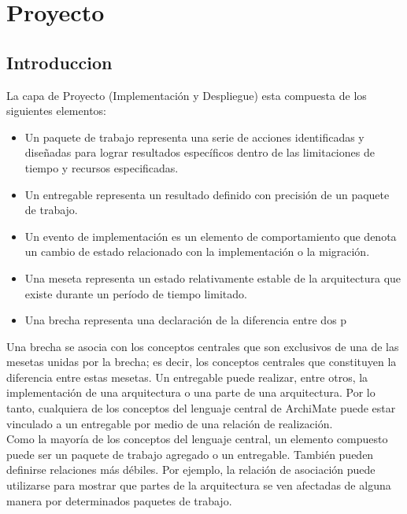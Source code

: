 \chapter{Proyecto}
\section{Introduccion}
La capa de Proyecto (Implementación y Despliegue) esta compuesta de los siguientes elementos:

\begin{itemize}
	\item Un paquete de trabajo representa una serie de acciones identificadas y diseñadas para lograr resultados específicos dentro de las limitaciones de tiempo y recursos especificadas.
	\item Un entregable representa un resultado definido con precisión de un paquete de trabajo.
	\item Un evento de implementación es un elemento de comportamiento que denota un cambio de estado relacionado con la implementación o la migración.
	\item Una meseta representa un estado relativamente estable de la arquitectura que existe durante un período de tiempo limitado.
	\item Una brecha representa una declaración de la diferencia entre dos p
\end{itemize}

Una brecha se asocia con los conceptos centrales que son exclusivos de una de las mesetas unidas por la brecha; es decir, los conceptos centrales que constituyen la diferencia entre estas mesetas. Un entregable puede realizar, entre otros, la implementación de una arquitectura o una parte de una arquitectura. Por lo tanto, cualquiera de los conceptos del lenguaje central de ArchiMate puede estar vinculado a un entregable por medio de una relación de realización.\\

Como la mayoría de los conceptos del lenguaje central, un elemento compuesto puede ser un paquete de trabajo agregado o un entregable. También pueden definirse relaciones más débiles. Por ejemplo, la relación de asociación puede utilizarse para mostrar que partes de la arquitectura se ven afectadas de alguna manera por determinados paquetes de trabajo.


